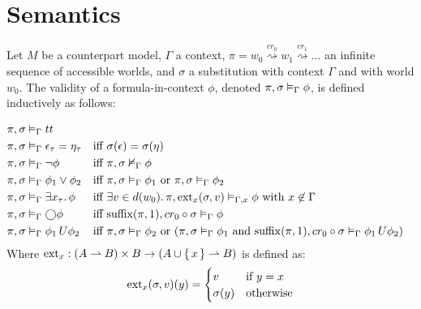 \section{Semantics}

\begin{definition}\label{def:fosemantic}
Let $M$ be a counterpart model, $\Gamma$ a context, $\pi = w_0 \overset{cr_0}{\rightsquigarrow} w_1
\overset{cr_1}{\rightsquigarrow} \ldots$ an infinite sequence of accessible worlds, and $\sigma$ a substitution with
context $\Gamma$ and with world $w_0$.  The validity of a formula-in-context $\phi$, denoted
${\pi}, {\sigma} \vDash_{\Gamma} {\phi}$, is defined inductively as follows:

\begin{align*}
  \pi, \sigma &\vDash_\Gamma tt \\
  \pi, \sigma &\vDash_\Gamma \epsilon_\tau = \eta_\tau &&\text{iff } \sigma(\epsilon) = \sigma(\eta) \\
  \pi, \sigma &\vDash_\Gamma \neg\phi &&\text{iff } {\pi}, {\sigma} \nvDash_{\Gamma} {\phi} \\
  \pi, \sigma &\vDash_\Gamma \phi_1 \lor \phi_2
      &&\text{iff } {\pi}, {\sigma} \vDash_{\Gamma} {\phi_1} \text{ or } {\pi}, {\sigma} \vDash_{\Gamma} {\phi_2} \\
  \pi, \sigma &\vDash_\Gamma \exists {x_\tau} \ldotp {\phi}
      &&\text{iff } \exists {v \in d(w_0)} \ldotp {{\pi}, {\operatorname{ext}_x(\sigma, v)} \vDash_{\Gamma, x} {\phi}}
        \text{ with } x \not\in \Gamma \\
  \pi, \sigma &\vDash_\Gamma \bigcirc{\phi}
      &&\text{iff } {\operatorname{suffix}(\pi, 1)}, {cr_0 \circ \sigma} \vDash_{\Gamma} {\phi} \\
  \pi, \sigma &\vDash_\Gamma {\phi_1}\,U {\phi_2}
      &&\text{iff } {\pi}, {\sigma} \vDash_{\Gamma} {\phi_2} \text{ or } ({\pi}, {\sigma} \vDash_{\Gamma} {\phi_1}
        \text { and } {\operatorname{suffix}(\pi, 1)}, {cr_0 \circ \sigma} \vDash_{\Gamma} {{\phi_1}\,U {\phi_2}})
\end{align*}
  Where $\operatorname{ext}_x : (A \rightharpoonup B) \times B \to (A \cup \set{x} \rightharpoonup B)$ is defined as:
  \[
    \operatorname{ext}_x(\sigma, v)(y) = \begin{cases} v & \text{if } y = x \\ \sigma(y) & \text{otherwise}\end{cases}
  \]
\end{definition}

